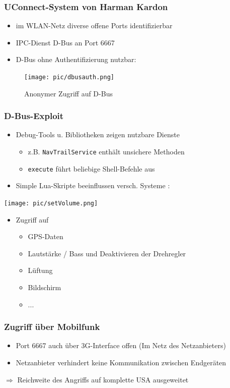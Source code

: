 \documentclass[t]{beamer}
\begin{document}
\begin{frame}
	\frametitle{UConnect-System von Harman Kardon}
    \begin{itemize}
    	\item im WLAN-Netz diverse offene Ports identifizierbar
    	\item IPC-Dienst D-Bus an Port 6667
    	\item D-Bus ohne Authentifizierung nutzbar:
   	\end{itemize}
    \begin{figure}
    \texttt{[image: pic/dbusauth.png]}
    \caption{Anonymer Zugriff auf D-Bus \cite{MiV15}}
    \end{figure}
\end{frame}

\begin{frame}
	\frametitle{D-Bus-Exploit}
	\begin{itemize}
    	\item Debug-Tools u. Bibliotheken zeigen nutzbare Dienste
        \begin{itemize}
        \item z.B. \texttt{NavTrailService} enthält unsichere Methoden
        \item \texttt{execute} führt beliebige Shell-Befehle aus
        \end{itemize}
        \item Simple Lua-Skripte beeinflussen versch. Systeme \cite{MiV15}:
    \end{itemize}
    \texttt{[image: pic/setVolume.png]}
    \begin{itemize}
    \item Zugriff auf
    \begin{itemize}
    \item GPS-Daten
    \item Lautstärke / Bass und Deaktivieren der Drehregler
    \item Lüftung
    \item Bildschirm
    \item ...
    \end{itemize}
    \end{itemize}
\end{frame}

\begin{frame}
	\frametitle{Zugriff über Mobilfunk}
    \begin{itemize}
		\item Port 6667 auch über 3G-Interface offen (Im Netz des Netzanbieters)
    \end{itemize}
    \begin{itemize}
        \item Netzanbieter verhindert keine Kommunikation zwischen Endgeräten
	\end{itemize}
    $\Rightarrow$ Reichweite des Angriffs auf komplette USA ausgeweitet
\end{frame}
\end{document}

